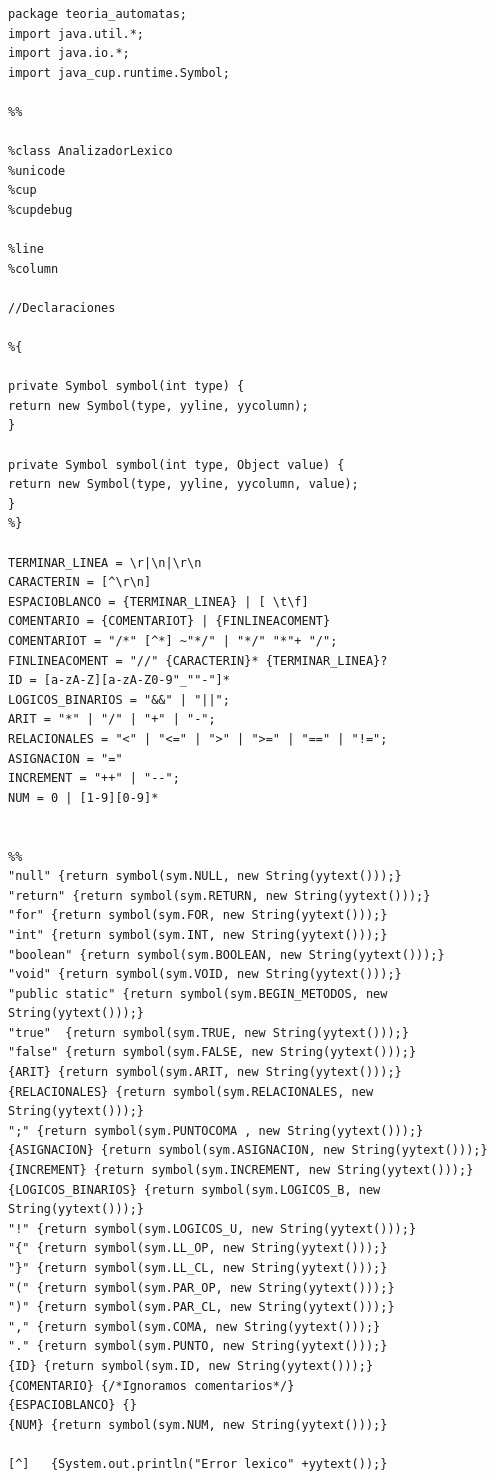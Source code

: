 \documentclass[12pt,a4paper]{article}
\begin{document}
\begin{lstlisting}[caption=Analizador Léxico en JFlex]
package teoria_automatas;
import java.util.*;
import java.io.*;
import java_cup.runtime.Symbol;

%%

%class AnalizadorLexico
%unicode
%cup
%cupdebug

%line
%column

//Declaraciones

%{

private Symbol symbol(int type) {
return new Symbol(type, yyline, yycolumn);
}

private Symbol symbol(int type, Object value) {
return new Symbol(type, yyline, yycolumn, value);
}
%}

TERMINAR_LINEA = \r|\n|\r\n
CARACTERIN = [^\r\n]
ESPACIOBLANCO = {TERMINAR_LINEA} | [ \t\f]
COMENTARIO = {COMENTARIOT} | {FINLINEACOMENT}
COMENTARIOT = "/*" [^*] ~"*/" | "*/" "*"+ "/";
FINLINEACOMENT = "//" {CARACTERIN}* {TERMINAR_LINEA}?
ID = [a-zA-Z][a-zA-Z0-9"_""-"]*
LOGICOS_BINARIOS = "&&" | "||";
ARIT = "*" | "/" | "+" | "-";
RELACIONALES = "<" | "<=" | ">" | ">=" | "==" | "!=";
ASIGNACION = "="
INCREMENT = "++" | "--";
NUM = 0 | [1-9][0-9]*


%%
"null" {return symbol(sym.NULL, new String(yytext()));} 
"return" {return symbol(sym.RETURN, new String(yytext()));} 
"for" {return symbol(sym.FOR, new String(yytext()));}
"int" {return symbol(sym.INT, new String(yytext()));}
"boolean" {return symbol(sym.BOOLEAN, new String(yytext()));}
"void" {return symbol(sym.VOID, new String(yytext()));}
"public static" {return symbol(sym.BEGIN_METODOS, new String(yytext()));}
"true"  {return symbol(sym.TRUE, new String(yytext()));}
"false" {return symbol(sym.FALSE, new String(yytext()));}
{ARIT} {return symbol(sym.ARIT, new String(yytext()));}
{RELACIONALES} {return symbol(sym.RELACIONALES, new String(yytext()));}
";" {return symbol(sym.PUNTOCOMA , new String(yytext()));}
{ASIGNACION} {return symbol(sym.ASIGNACION, new String(yytext()));}
{INCREMENT} {return symbol(sym.INCREMENT, new String(yytext()));}
{LOGICOS_BINARIOS} {return symbol(sym.LOGICOS_B, new String(yytext()));}
"!" {return symbol(sym.LOGICOS_U, new String(yytext()));}
"{" {return symbol(sym.LL_OP, new String(yytext()));}
"}" {return symbol(sym.LL_CL, new String(yytext()));}
"(" {return symbol(sym.PAR_OP, new String(yytext()));}
")" {return symbol(sym.PAR_CL, new String(yytext()));}
"," {return symbol(sym.COMA, new String(yytext()));}
"." {return symbol(sym.PUNTO, new String(yytext()));}
{ID} {return symbol(sym.ID, new String(yytext()));}
{COMENTARIO} {/*Ignoramos comentarios*/}
{ESPACIOBLANCO} {}
{NUM} {return symbol(sym.NUM, new String(yytext()));}

[^]   {System.out.println("Error lexico" +yytext());}



\end{lstlisting}
\end{document}
